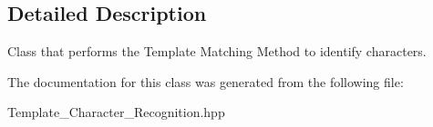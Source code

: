 \subsection{Detailed Description}
Class that performs the Template Matching Method to identify characters. 

The documentation for this class was generated from the following file\+:\begin{DoxyCompactItemize}
\item 
Template\+\_\+\+Character\+\_\+\+Recognition.\+hpp\end{DoxyCompactItemize}
